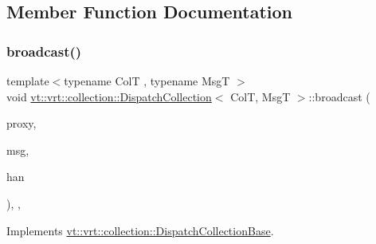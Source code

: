 \subsection{Member Function Documentation}
\mbox{\label{structvt_1_1vrt_1_1collection_1_1_dispatch_collection_a15fb496ed66606dd9feeb5ff80138ccf}} 
\subsubsection{\texorpdfstring{broadcast()}{broadcast()}}
{\footnotesize\ttfamily template$<$typename ColT , typename MsgT $>$ \\
void \hyperlink{structvt_1_1vrt_1_1collection_1_1_dispatch_collection}{vt\+::vrt\+::collection\+::\+Dispatch\+Collection}$<$ ColT, MsgT $>$\+::broadcast (\begin{DoxyParamCaption}\item[{\hyperlink{namespacevt_a1b417dd5d684f045bb58a0ede70045ac}{Virtual\+Proxy\+Type}}]{proxy,  }\item[{std\+::byte $\ast$}]{msg,  }\item[{\hyperlink{namespacevt_af64846b57dfcaf104da3ef6967917573}{Handler\+Type}}]{han }\end{DoxyParamCaption})\hspace{0.3cm}{\ttfamily [override]}, {\ttfamily [private]}, {\ttfamily [virtual]}}



Implements \hyperlink{structvt_1_1vrt_1_1collection_1_1_dispatch_collection_base_a9f1633d0cb82a00f84e3f644254a3cb8}{vt\+::vrt\+::collection\+::\+Dispatch\+Collection\+Base}.

\mbox{\label{structvt_1_1vrt_1_1collection_1_1_dispatch_collection_a24880789074a425cc71588119f1ccea7}} 
